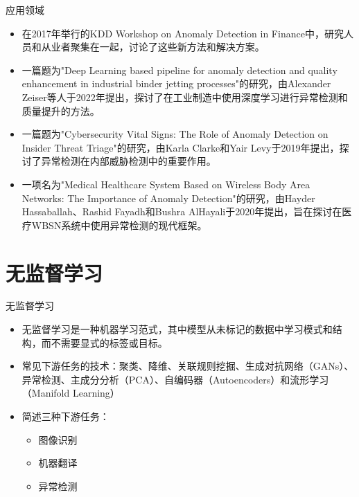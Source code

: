 \documentclass[UTF8]{beamer}
\begin{document}
\begin{frame}{应用领域}
    \scriptsize
    \begin{itemize}
        \item 在2017年举行的KDD Workshop on Anomaly Detection in Finance中，研究人员和从业者聚集在一起，讨论了这些新方法和解决方案。
        \item 一篇题为"Deep Learning based pipeline for anomaly detection and quality enhancement in industrial binder jetting processes"的研究，由Alexander Zeiser等人于2022年提出，探讨了在工业制造中使用深度学习进行异常检测和质量提升的方法。
        \item 一篇题为"Cybersecurity Vital Signs: The Role of Anomaly Detection on Insider Threat Triage"的研究，由Karla Clarke和Yair Levy于2019年提出，探讨了异常检测在内部威胁检测中的重要作用。
        \item 一项名为"Medical Healthcare System Based on Wireless Body Area Networks: The Importance of Anomaly Detection"的研究，由Hayder Hassaballah、Rashid Fayadh和Bushra AlHayali于2020年提出，旨在探讨在医疗WBSN系统中使用异常检测的现代框架。
    \end{itemize}
\end{frame}


\section{无监督学习}

\begin{frame}{无监督学习}
    \begin{itemize}
        \item 无监督学习是一种机器学习范式，其中模型从未标记的数据中学习模式和结构，而不需要显式的标签或目标。
        \item 常见下游任务的技术：聚类、降维、关联规则挖掘、生成对抗网络（GANs）、异常检测、主成分分析（PCA）、自编码器（Autoencoders）和流形学习（Manifold Learning）
        \item 简述三种下游任务：
        \begin{itemize}
            \item 图像识别
            \item 机器翻译
            \item 异常检测
        \end{itemize}
    \end{itemize}
\end{frame}
\end{document}
